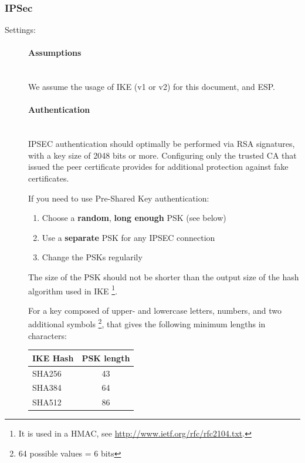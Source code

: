 \subsubsection{IPSec}
\label{section:IPSECgeneral}


\begin{description}

\item[Settings:] \mbox{}

\paragraph*{Assumptions}\mbox{}\\

We assume the usage of IKE (v1 or v2) for this document, and ESP.

\paragraph*{Authentication}\mbox{}\\

IPSEC authentication should optimally be performed via RSA signatures,
with a key size of 2048 bits or more. Configuring only the trusted CA
that issued the peer certificate provides for additional protection
against fake certificates.

If you need to use Pre-Shared Key authentication:

\begin{enumerate}
\item Choose a \textbf{random}, \textbf{long enough} PSK (see below)
\item Use a \textbf{separate} PSK for any IPSEC connection
\item Change the PSKs regularily
\end{enumerate}

The size of the PSK should not be shorter than the output size of
the hash algorithm used in IKE \footnote{It is used in a HMAC, see
  \url{http://www.ietf.org/rfc/rfc2104.txt}.}.

For a key composed of upper- and lowercase letters, numbers, and two
additional symbols \footnote{64 possible values = 6 bits}, that gives
the following minimum lengths in characters:

\begin{table}[h]
  \centering
  \small
  \begin{tabular}{lc}
    \toprule
    IKE Hash & PSK length \\
    \midrule
    SHA256 & 43 \\
    SHA384 & 64 \\
    SHA512 & 86 \\
    \bottomrule
  \end{tabular}
\end{table}


\end{description}
